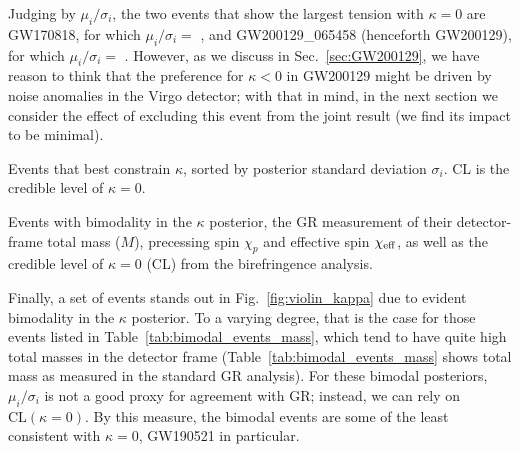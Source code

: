 \documentclass[aps,prd,twocolumn,superscriptaddress,preprintnumbers,floatfix,nofootinbib]{revtex4-2}
\begin{document}
Judging by $\mu_i/\sigma_i$, the two events that show the largest tension with $\kappa = 0$ are GW170818, for which $\mu_i / \sigma_i =$ , and GW200129\_065458 (henceforth GW200129), for which $\mu_i / \sigma_i =$ .
However, as we discuss in Sec.~\ref{sec:GW200129}, we have reason to think that the preference for $\kappa < 0$ in GW200129 might be driven by noise anomalies in the Virgo detector; with that in mind, in the next section we consider the effect of excluding this event from the joint result (we find its impact to be minimal).

\begin{table}
    \caption{Events that best constrain $\kappa$, sorted by posterior standard deviation $\sigma_i$. CL is the credible level of $\kappa = 0$.}
    \begin{ruledtabular}
    \end{ruledtabular}
    \label{tab:best_events_kappa}
\end{table}

\begin{table}
    \caption{Events with bimodality in the $\kappa$ posterior, the \ac{GR} measurement of their detector-frame total mass ($M$), precessing spin $\chi_p$ and effective spin $\chi_{\rm eff}$, as well as the credible level of $\kappa = 0$ (CL) from the birefringence analysis.}
    \begin{ruledtabular}
    \end{ruledtabular}
    \label{tab:bimodal_events_mass}
\end{table}

Finally, a set of events stands out in Fig.~\ref{fig:violin_kappa} due to evident bimodality in the $\kappa$ posterior.
To a varying degree, that is the case for those events listed in Table~\ref{tab:bimodal_events_mass}, which tend to have quite high total masses in the detector frame (Table~\ref{tab:bimodal_events_mass} shows total mass as measured in the standard \ac{GR} analysis).
For these bimodal posteriors, $\mu_i/\sigma_i$ is not a good proxy for agreement with \ac{GR}; instead, we can rely on $\mathrm{CL}(\kappa = 0)$.
By this measure, the bimodal events are some of the least consistent with $\kappa = 0$, GW190521 in particular.
\end{document}
